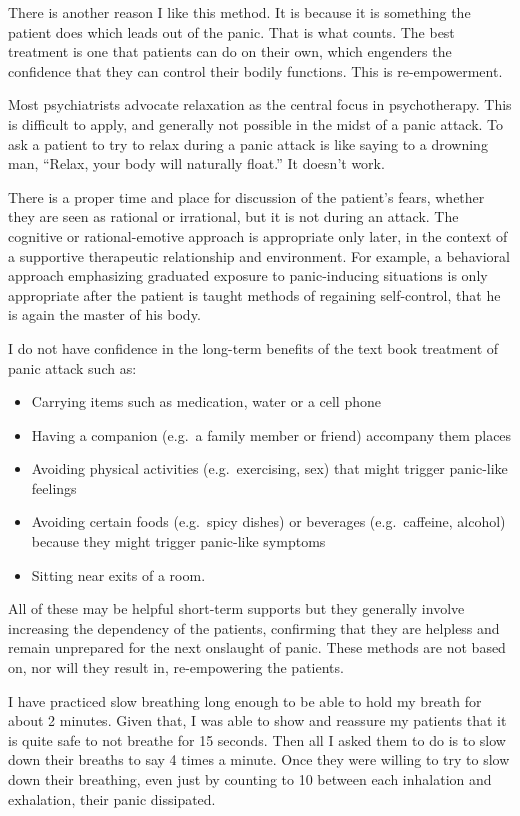 \documentclass[]{book}
\begin{document}
There is another reason I like this method. It is because it is something the patient does which leads out of the panic. That is what counts. The best treatment is one that patients can do on their own, which engenders the confidence that they can control their bodily functions. This is re-empowerment.

Most psychiatrists advocate relaxation as the central focus in psychotherapy. This is difficult to apply, and generally not possible in the midst of a panic attack. To ask a patient to try to relax during a panic attack is like saying to a drowning man, ``Relax, your body will naturally float.'' It doesn't work.

There is a proper time and place for discussion of the patient's fears, whether they are seen as rational or irrational, but it is not during an attack. The cognitive or rational-emotive approach is appropriate only later, in the context of a supportive therapeutic relationship and environment. For example, a behavioral approach emphasizing graduated exposure to panic-inducing situations is only appropriate after the patient is taught methods of regaining self-control, that he is again the master of his body.

I do not have confidence in the long-term benefits of the text book treatment of panic attack such as:

\begin{itemize}
\item
  Carrying items such as medication, water or a cell phone
\item
  Having a companion (e.g.~a family member or friend) accompany them places
\item
  Avoiding physical activities (e.g.~exercising, sex) that might trigger panic-like feelings
\item
  Avoiding certain foods (e.g.~spicy dishes) or beverages (e.g.~caffeine, alcohol) because they might trigger panic-like symptoms
\item
  Sitting near exits of a room.
\end{itemize}

All of these may be helpful short-term supports but they generally involve increasing the dependency of the patients, confirming that they are helpless and remain unprepared for the next onslaught of panic. These methods are not based on, nor will they result in, re-empowering the patients.

I have practiced slow breathing long enough to be able to hold my breath for about 2 minutes. Given that, I was able to show and reassure my patients that it is quite safe to not breathe for 15 seconds. Then all I asked them to do is to slow down their breaths to say 4 times a minute. Once they were willing to try to slow down their breathing, even just by counting to 10 between each inhalation and exhalation, their panic dissipated.
\end{document}
